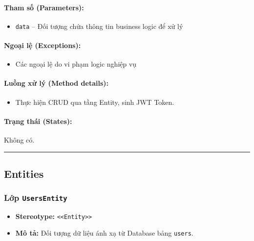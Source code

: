 \documentclass[12pt,a4paper]{article}
\begin{document}
\paragraph{Tham số (Parameters):}
\begin{itemize}[leftmargin=*]
    \item \texttt{data} – Đối tượng chứa thông tin business logic để xử lý
\end{itemize}


\paragraph{Ngoại lệ (Exceptions):}
\begin{itemize}[leftmargin=*]
    \item Các ngoại lệ do vi phạm logic nghiệp vụ
\end{itemize}


\paragraph{Luồng xử lý (Method details):}
\begin{itemize}[leftmargin=*]
    \item Thực hiện CRUD qua tầng Entity, sinh JWT Token.
\end{itemize}


\paragraph{Trạng thái (States):}
Không có.

\vskip 0.5cm
\noindent\rule{\textwidth}{0.5pt}
\vskip 0.5cm

\subsection{Entities}


\subsubsection{Lớp \texttt{UsersEntity}}

\begin{itemize}[leftmargin=*]
    \item \textbf{Stereotype:} \texttt{\textless{}\textless{}Entity\textgreater{}\textgreater{}}
    \item \textbf{Mô tả:} Đối tượng dữ liệu ánh xạ từ Database bảng \texttt{users}.
\end{itemize}
\end{document}
